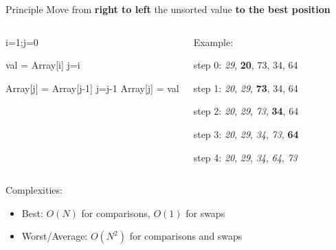 \documentclass{beamer}[10pt, usepdftitle=false, handout]
\begin{document}
	\begin{frame}
	\begin{block}{Principle}
	Move from \textbf{right to left} the unsorted value \textbf{to the best position}
	\end{block}	
	
	\begin{columns}[c]
	\begin{center}    
    \scalebox{0.75} {
    \begin{algorithm}[H]
	i=1;j=0\;
	 {
		val = Array[i]\;
		j=i\;
		
		 {
			Array[j] = Array[j-1]\;
			j=j-1\;		
		} 
		Array[j] = val\;	
	}
	\end{algorithm}	
	}
	\end{center}			
	
	\begin{center}
%	
	Example:
	\vspace*{1em}	
	
	step 0: \textit{29}, \textbf{20}, 73, 34, 64

	step 1: \textit{20}, \textit{29}, \textbf{73}, 34, 64

	step 2: \textit{20}, \textit{29}, \textit{73}, \textbf{34}, 64

	step 3: \textit{20}, \textit{29}, \textit{34}, \textit{73}, \textbf{64}

	step 4: \textit{20}, \textit{29}, \textit{34}, \textit{64}, \textit{73}
		

	\end{center}	
		
	\end{columns}
			
	\vspace*{1em}
	Complexities: 
	
	\begin{itemize}
		\item {Best: $O(N)$ for comparisons, $O(1)$ for swaps}
		\item {Worst/Average: $O(N^2)$ for comparisons and swaps}
	\end{itemize}				
			
			
	\end{frame}	
	
\end{document}
